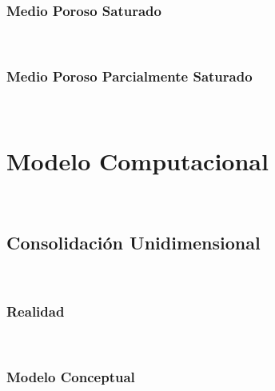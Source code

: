 \subsubsection{Medio Poroso Saturado}~\hypertarget{sec:sec3424}{}
\label{sec:sec3424}




\subsubsection{Medio Poroso Parcialmente Saturado}~\hypertarget{sec:sec3425}{}
\label{sec:sec34245}




\section{Modelo Computacional}~\hypertarget{sec:sec350}{}
\label{sec:sec350}


\subsection{Consolidación Unidimensional}~\hypertarget{sec:sec351}{}
\label{sec:sec351}

\subsubsection{Realidad}~\hypertarget{sec:sec3511}{}
\label{sec:sec3511}


\subsubsection{Modelo Conceptual}~\hypertarget{sec:sec3512}{}
\label{sec:sec3512}


